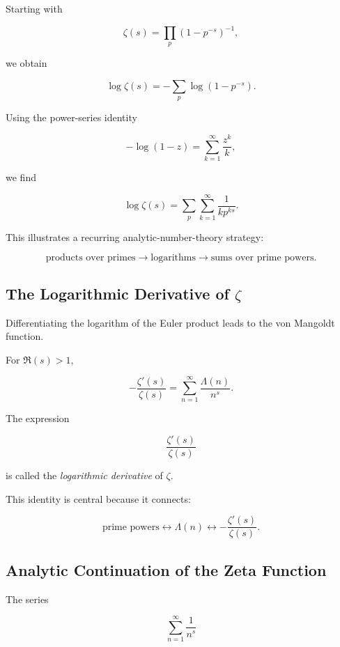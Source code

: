 Starting with

\[ \zeta(s)=\prod_p(1-p^{-s})^{-1}, \]

we obtain

\[ \log\zeta(s)=-\sum_p\log(1-p^{-s}). \]

Using the power-series identity

\[ -\log(1-z)=\sum_{k=1}^{\infty}\frac{z^k}{k}, \]

we find

\[ \log\zeta(s)=\sum_p\sum_{k=1}^{\infty}\frac{1}{k p^{ks}}. \]

This illustrates a recurring analytic-number-theory strategy:

\[
\boxed{
\text{products over primes}
\longrightarrow
\text{logarithms}
\longrightarrow
\text{sums over prime powers}.
}
\]

\subsection{The Logarithmic Derivative of \(\zeta\)}
\label{subsec:zeta-logarithmic-derivative}

Differentiating the logarithm of the Euler product leads to the von Mangoldt
function.

For \(\Re(s)>1\),

\[ \boxed{-\frac{\zeta'(s)}{\zeta(s)}=\sum_{n=1}^{\infty}\frac{\Lambda(n)}{n^s}.} \]

The expression

\[ \frac{\zeta'(s)}{\zeta(s)} \]

is called the \emph{logarithmic derivative} of \(\zeta\).

This identity is central because it connects:

\[
\text{prime powers}
\longleftrightarrow
\Lambda(n)
\longleftrightarrow
-\frac{\zeta'(s)}{\zeta(s)}.
\]

\subsection{Analytic Continuation of the Zeta Function}
\label{subsec:zeta-analytic-continuation}

The series

\[ \sum_{n=1}^{\infty}\frac1{n^s} \]

